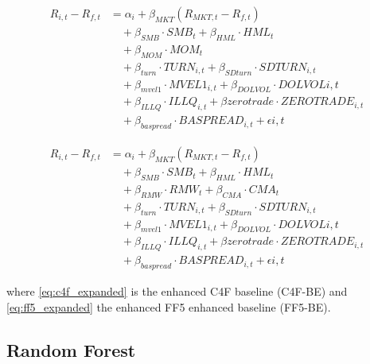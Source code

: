 \begin{equation}
    \label{eq:c4f_expanded}
    \begin{split}
    R_{i,t} - R_{f,t} &= \alpha_i + \beta_{MKT} (R_{MKT,t} - R_{f,t}) \\
    &\quad + \beta_{SMB} \cdot SMB_t + \beta_{HML} \cdot HML_t \\
    &\quad + \beta_{MOM} \cdot MOM_t \\
    &\quad + \beta_{turn} \cdot TURN_{i,t} + \beta_{SDturn} \cdot SDTURN_{i,t} \\
    &\quad + \beta_{mvel1} \cdot MVEL1_{i,t} + \beta_{DOLVOL} \cdot DOLVOL{i,t} \\
    &\quad + \beta_{ILLQ} \cdot ILLQ_{i,t} + \beta{zerotrade} \cdot ZEROTRADE_{i,t} \\
    &\quad + \beta_{baspread} \cdot BASPREAD_{i,t} + \epsilon{i,t}
    \end{split}
\end{equation}

\begin{equation}
    \label{eq:ff5_expanded}
    \begin{split}
    R_{i,t} - R_{f,t} &= \alpha_i + \beta_{MKT} (R_{MKT,t} - R_{f,t}) \\
    &\quad + \beta_{SMB} \cdot SMB_t + \beta_{HML} \cdot HML_t \\
    &\quad + \beta_{RMW} \cdot RMW_t + \beta_{CMA} \cdot CMA_t\\
    &\quad + \beta_{turn} \cdot TURN_{i,t} + \beta_{SDturn} \cdot SDTURN_{i,t} \\
    &\quad + \beta_{mvel1} \cdot MVEL1_{i,t} + \beta_{DOLVOL} \cdot DOLVOL{i,t} \\
    &\quad + \beta_{ILLQ} \cdot ILLQ_{i,t} + \beta{zerotrade} \cdot ZEROTRADE_{i,t} \\
    &\quad + \beta_{baspread} \cdot BASPREAD_{i,t} + \epsilon{i,t}
    \end{split}
\end{equation}

where \cref{eq:c4f_expanded} is the enhanced C4F baseline (C4F-BE) and \cref{eq:ff5_expanded} the enhanced FF5 enhanced baseline (FF5-BE). %


\subsection{Random Forest}



